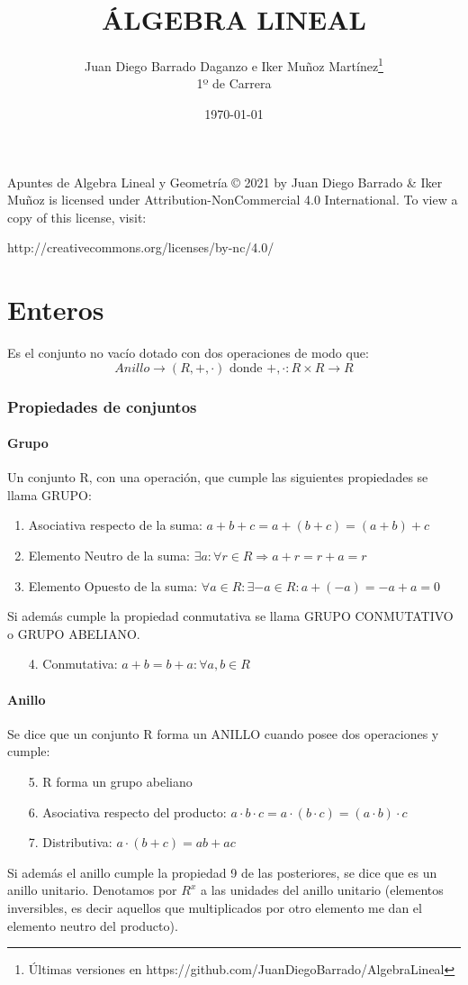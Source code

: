 \documentclass[10pt,a4paper,openright]{book}
\title{ÁLGEBRA LINEAL}
\author{Juan Diego Barrado Daganzo e Iker Muñoz Martínez\footnote{Últimas versiones en https://github.com/JuanDiegoBarrado/AlgebraLineal}\\1º de Carrera} %
\date{\today}
\theoremstyle{break}
\begin{document}
\maketitle

Apuntes de Algebra Lineal y Geometría © 2021 by Juan Diego Barrado \& Iker Muñoz is licensed under Attribution-NonCommercial 4.0 International. To view a copy of this license, visit:
\begin{center}
http://creativecommons.org/licenses/by-nc/4.0/
\end{center}

\mainmatter
\chapter{Enteros}
Es el conjunto no vacío dotado con dos operaciones de modo que:
$$Anillo \rightarrow (R,+,\cdot)\mbox{ donde }+,\cdot : R\times R \rightarrow R$$
\subsection{Propiedades de conjuntos}
\subsubsection*{Grupo}
Un conjunto R, con una operación, que cumple las siguientes propiedades se llama GRUPO:
\begin{enumerate}
\item Asociativa respecto de la suma: $a+b+c=a+(b+c)=(a+b)+c$
\item Elemento Neutro de la suma: $\exists a : \forall r \in R \Rightarrow a+r=r+a=r$
\item Elemento Opuesto de la suma: $\forall a \in R : \exists -a\in R : a+(-a)=-a+a=0$
\end{enumerate}
Si además cumple la propiedad conmutativa se llama GRUPO CONMUTATIVO o GRUPO ABELIANO.
\begin{enumerate}
\item[4.] Conmutativa: $a+b=b+a: \forall a,b\in R $
\end{enumerate}

\subsubsection*{Anillo}
Se dice que un conjunto R forma un ANILLO cuando posee dos operaciones y cumple:
\begin{enumerate}
\item [5.]R forma un grupo abeliano
\item [6.]Asociativa respecto del producto: $a\cdot b\cdot c=a\cdot(b\cdot c)=(a\cdot b)\cdot c$
\item [7.]Distributiva: $a\cdot(b+c)=ab+ac$
\end{enumerate}
Si además el anillo cumple la propiedad 9 de las posteriores, se dice que es un anillo unitario. Denotamos por $R^{x}$ a las unidades del anillo unitario (elementos inversibles, es decir aquellos que multiplicados por otro elemento me dan el elemento neutro del producto).
\end{document}
